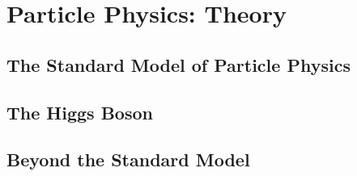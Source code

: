 \chapter{Particle Physics: Theory}

\section{The Standard Model of Particle Physics}

\section{The Higgs Boson}

\section{Beyond the Standard Model}
